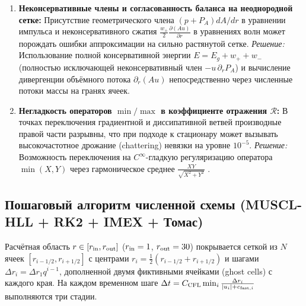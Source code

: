 \documentclass[11pt,a4paper]{article}
\begin{document}
\begin{enumerate}
\item \textbf{Неконсервативные члены и согласованность баланса на неоднородной сетке:}
Присутствие геометрического члена $(p + P_A)dA/dr$ в уравнении импульса и неконсервативного сжатия $\frac{w_\pm}{2}\frac{\partial(Au)}{\partial r}$ в уравнениях волн может порождать ошибки аппроксимации на сильно растянутой сетке.
\emph{Решение:} Использование полной консервативной энергии $E = E_g + w_+ + w_-$ (полностью исключающей неконсервативный член $-u\,\partial_r P_A$) и вычисление дивергенции объёмного потока $\partial_r(Au)$ непосредственно через численные потоки массы на гранях ячеек.

\item \textbf{Негладкость операторов $\min/\max$ в коэффициенте отражения $\mathcal{R}$:}
В точках переключения градиентной и диссипативной ветвей производные правой части разрывны, что при подходе к стационару может вызывать высокочастотное дрожание (chattering) невязки на уровне $10^{-5}$.
\emph{Решение:} Возможность переключения на $C^\infty$-гладкую регуляризацию оператора $\min(X, Y)$ через гармоническое среднее $\frac{XY}{\sqrt{X^2 + Y^2}}$ \cite{Cranmer2007}.
\end{enumerate}

\subsection{Пошаговый алгоритм численной схемы (MUSCL-HLL + RK2 + IMEX + Томас)}

Расчётная область $r \in [r_{\rm in}, r_{\rm out}]$ ($r_{\rm in} = 1$, $r_{\rm out} = 30$) покрывается сеткой из $N$ ячеек $[r_{i-1/2}, r_{i+1/2}]$ с центрами $r_i = \frac{1}{2}(r_{i-1/2} + r_{i+1/2})$ и шагами $\Delta r_i = \Delta r_1 q^{i-1}$, дополненной двумя фиктивными ячейками (ghost cells) с каждого края. На каждом временном шаге $\Delta t = C_{\rm CFL}\min_i \frac{\Delta r_i}{|u_i| + c_{{\rm fast},i}}$ выполняются три стадии.
\end{document}
